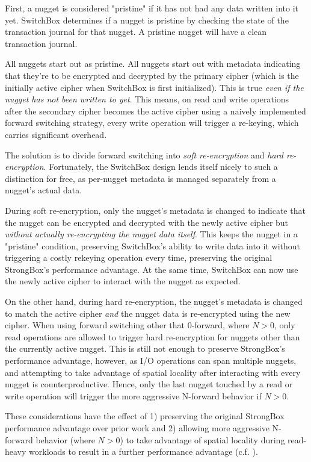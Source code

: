First, a nugget is considered "pristine" if it has not had any data written into
it yet. SwitchBox determines if a nugget is pristine by checking the state of
the transaction journal for that nugget. A pristine nugget will have a clean
transaction journal.

All nuggets start out as pristine. All nuggets start out with metadata
indicating that they're to be encrypted and decrypted by the primary cipher
(which is the initially active cipher when SwitchBox is first initialized). This
is true \emph{even if the nugget has not been written to yet}. This means, on
read and write operations after the secondary cipher becomes the active cipher
using a naively implemented forward switching strategy, every write operation
will trigger a re-keying, which carries significant overhead.

The solution is to divide forward switching into \emph{soft re-encryption} and
\emph{hard re-encryption}. Fortunately, the SwitchBox design lends itself nicely
to such a distinction for free, as per-nugget metadata is managed separately
from a nugget's actual data.

During soft re-encryption, only the nugget's metadata is changed to indicate
that the nugget can be encrypted and decrypted with the newly active cipher but
\emph{without actually re-encrypting the nugget data itself}. This keeps the
nugget in a "pristine" condition, preserving SwitchBox's ability to write data
into it without triggering a costly rekeying operation every time, preserving
the original StrongBox's performance advantage. At the same time, SwitchBox can
now use the newly active cipher to interact with the nugget as expected.

On the other hand, during hard re-encryption, the nugget's metadata is changed
to match the active cipher \emph{and} the nugget data is re-encrypted using the
new cipher. When using forward switching other that 0-forward, 
where $N > 0$, only read operations are allowed to trigger hard re-encryption
for nuggets other than the currently active nugget. This is still not enough to
preserve StrongBox's performance advantage, however, as I/O operations can span
multiple nuggets, and attempting to take advantage of spatial locality after
interacting with every nugget is counterproductive. Hence, only the last nugget
touched by a read or write operation will trigger the more aggressive N-forward
behavior if $N > 0$.

These considerations have the effect of 1) preserving the original StrongBox
performance advantage over prior work and 2) allowing more aggressive N-forward
behavior (where $N > 0$) to take advantage of spatial locality during read-heavy
workloads to result in a further performance advantage (c.f.
).

